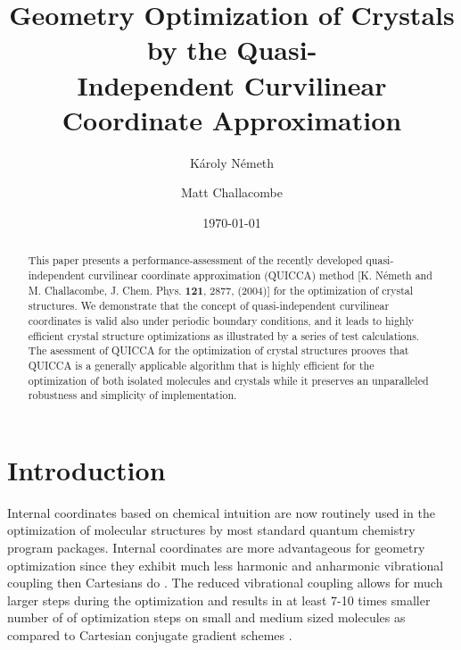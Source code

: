 \documentclass[prl,aps,preprint,superbib,12pt]{revtex4}
\begin{document}
\title{Geometry Optimization of Crystals by the Quasi-\\
       Independent Curvilinear Coordinate Approximation}

\author{K\'aroly N\'emeth\footnotemark[1]}
\author{Matt Challacombe}


\date{\today}

\begin{abstract}
This paper presents a performance-assessment 
of the recently developed quasi-independent curvilinear coordinate
approximation (QUICCA) method [K. N\'emeth and M. Challacombe,
J. Chem. Phys. {\bf 121}, 2877, (2004)] for the optimization of crystal 
structures. 
We demonstrate that the concept of quasi-independent
curvilinear coordinates is valid also under periodic boundary 
conditions,
and it leads to highly efficient crystal structure optimizations
as illustrated by a series of test calculations. 
The asessment of QUICCA for the optimization of crystal structures
prooves that QUICCA is a generally applicable algorithm
that is highly efficient for the optimization of both isolated 
molecules and crystals while it preserves an unparalleled robustness 
and simplicity of implementation.
\end{abstract}


\maketitle


\section{Introduction}
Internal coordinates based on chemical intuition 
are now routinely used in the optimization of 
molecular structures by most standard quantum chemistry program 
packages. Internal coordinates are more advantageous 
for geometry optimization since they exhibit much less 
harmonic and anharmonic vibrational coupling then Cartesians do
\cite{PPulay69,GFogarasi79,GFogarasi92,PPulay77}.
The reduced vibrational coupling allows for much larger steps during the
optimization and results in at least 7-10 times smaller number of 
of optimization steps on small and medium sized molecules
as compared to Cartesian conjugate gradient schemes \cite{TBucko05}.  
\end{document}
